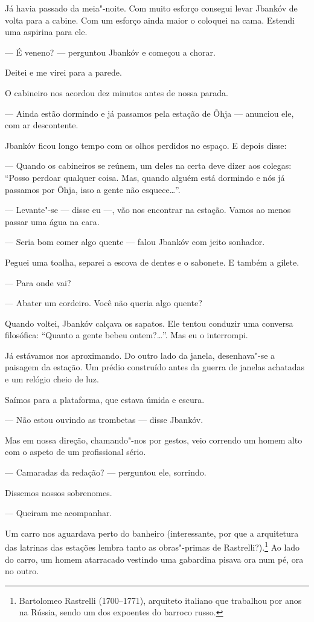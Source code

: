 Já havia passado da meia"-noite. Com muito esforço consegui levar Jbankóv
de volta para a cabine. Com um esforço ainda maior o coloquei na cama.
Estendi uma aspirina para ele.

--- É veneno? --- perguntou Jbankóv e começou a chorar.

Deitei e me virei para a parede.

O cabineiro nos acordou dez minutos antes de nossa parada.

--- Ainda estão dormindo e já passamos pela estação de Õhja
--- anunciou ele, com ar descontente.

Jbankóv ficou longo tempo com os olhos perdidos no espaço. E depois
disse:

--- Quando os cabineiros se reúnem, um deles na certa deve dizer
aos colegas: ``Posso perdoar qualquer coisa. Mas, quando alguém está
dormindo e nós já passamos por Õhja, isso a gente não esquece\ldots{}''.

--- Levante"-se --- disse eu ---, vão nos encontrar
na estação. Vamos ao menos passar uma água na cara.

--- Seria bom comer algo quente --- falou Jbankóv com
jeito sonhador.

Peguei uma toalha, separei a escova de dentes e o sabonete. E também a
gilete.

--- Para onde vai?

--- Abater um cordeiro. Você não queria algo quente?

Quando voltei, Jbankóv calçava os sapatos. Ele tentou conduzir uma
conversa filosófica: ``Quanto a gente bebeu ontem?\ldots{}''. Mas eu o
interrompi.

Já estávamos nos aproximando. Do outro lado da janela, desenhava"-se a
paisagem da estação. Um prédio construído antes da guerra de janelas
achatadas e um relógio cheio de luz.

Saímos para a plataforma, que estava úmida e escura.

--- Não estou ouvindo as trombetas --- disse Jbankóv.

Mas em nossa direção, chamando"-nos por gestos, veio correndo um homem
alto com o aspeto de um profissional sério.

--- Camaradas da redação? --- perguntou ele, sorrindo.

Dissemos nossos sobrenomes.

--- Queiram me acompanhar.

Um carro nos aguardava perto do banheiro (interessante, por que a
arquitetura das latrinas das estações lembra tanto as obras"-primas de
Rastrelli?).\footnote{Bartolomeo Rastrelli (1700--1771), arquiteto
  italiano que trabalhou por anos na Rússia, sendo um dos expoentes do
  barroco russo.} Ao lado do carro, um homem atarracado vestindo uma
gabardina pisava ora num pé, ora no outro.

